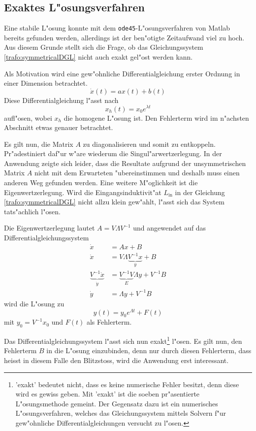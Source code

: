 \begin{refsection}
\subsection{Exaktes L"osungsverfahren}
Eine stabile L"osung konnte mit dem \texttt{ode45}-L"osungsverfahren von Matlab bereits gefunden werden, allerdings ist der ben"otigte Zeitaufwand viel zu hoch. Aus diesem Grunde stellt sich die Frage, ob das Gleichungssystem \ref{trafo:symmetricalDGL} nicht auch exakt gel"ost werden kann.

Als Motivation wird eine gew"ohnliche Differentialgleichung erster Ordnung in einer Dimension betrachtet. 
\begin{equation*}
	\dot{x}(t) = a x(t) + b(t)
	\label{trafo:1D_DGL}
\end{equation*}
Diese Differentialgleichung l"asst nach
\begin{equation*}
	x_h(t) = x_0 e^{\lambda t}
	\label{trafo:homogene_Loesung}
\end{equation*}
aufl"osen, wobei $x_h$ die homogene L"osung ist. Den Fehlerterm wird im n"achsten Abschnitt etwas genauer betrachtet. 

Es gilt nun, die Matrix $A$ zu diagonalisieren und somit zu entkoppeln. Pr"adestiniert daf"ur w"are wiederum die Singul"arwertzerlegung. In der Anwendung zeigte sich leider, dass die Resultate aufgrund der unsymmetrischen Matrix $A$ nicht mit dem Erwarteten "ubereinstimmen und deshalb muss einen anderen Weg gefunden werden. Eine weitere M"oglichkeit ist die Eigenwertzerlegung. Wird die Eingangsinduktivit"at $L_\mathrm{in}$ in der Gleichung \ref{trafo:symmetricalDGL} nicht allzu klein gew"ahlt, l"asst sich das System tats"achlich l"osen.

Die Eigenwertzerlegung lautet $A = V\Lambda V^{-1}$ und angewendet auf das Differentialgleichungssystem 
\begin{align*}
	\dot{x} &= Ax + B \\
	\dot{x} &= V \Lambda \underbrace{V^{-1} x}_{y} + B \\
	\underbrace{V^{-1} \dot{x}}_{\dot{y}} &= \underbrace{V^{-1}V}_{E} \Lambda y + V^{-1} B \\
	\dot{y} &= \Lambda y + V^{-1} B
\end{align*}
wird die L"osung zu
\begin{equation}
	y(t) = y_0 e^{\Lambda t} + F(t)
	\label{trafo:TransfDGL}
\end{equation}
mit $y_0 = V^{-1}x_0$ und $F(t)$ als Fehlerterm.

Das Differentialgleichungssystem l"asst sich nun exakt\footnote{'exakt' bedeutet nicht, dass es keine numerische Fehler besitzt, denn diese wird es gewiss geben. Mit 'exakt' ist die soeben pr"asentierte L"osungsmethode gemeint. Der Gegensatz dazu ist ein numerisches L"osungsverfahren, welches das Gleichungssystem mittels Solvern f"ur gew"ohnliche Differentialgleichungen versucht zu l"osen.} l"osen. Es gilt nun, den Fehlerterm $B$ in die L"osung einzubinden, denn nur durch diesen Fehlerterm, dass heisst in diesem Falle den Blitzstoss, wird die Anwendung erst interessant.


\end{refsection}

